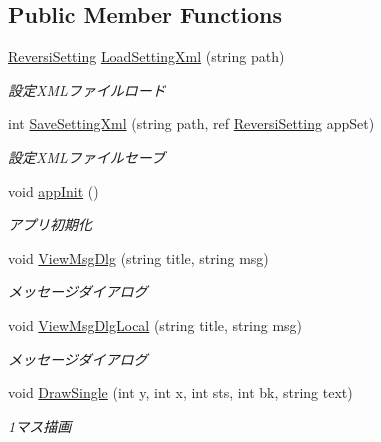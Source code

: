 \subsection*{Public Member Functions}
\begin{DoxyCompactItemize}
\item 
\hyperlink{class_reversi4color_form_1_1_reversi_setting}{Reversi\+Setting} \hyperlink{class_reversi4color_form_1_1_reversi_a944e9618d0eac2a6928d8a8ec835d384}{Load\+Setting\+Xml} (string path)
\begin{DoxyCompactList}\small\item\em 設定\+X\+M\+Lファイルロード \end{DoxyCompactList}\item 
int \hyperlink{class_reversi4color_form_1_1_reversi_aff9f10404fc96f56154073d324d4dea2}{Save\+Setting\+Xml} (string path, ref \hyperlink{class_reversi4color_form_1_1_reversi_setting}{Reversi\+Setting} app\+Set)
\begin{DoxyCompactList}\small\item\em 設定\+X\+M\+Lファイルセーブ \end{DoxyCompactList}\item 
void \hyperlink{class_reversi4color_form_1_1_reversi_ab30feb8c247bae6c78fa935456cf909a}{app\+Init} ()
\begin{DoxyCompactList}\small\item\em アプリ初期化 \end{DoxyCompactList}\item 
void \hyperlink{class_reversi4color_form_1_1_reversi_a4a67f1f9a3782d08790aa60b5ce10ab0}{View\+Msg\+Dlg} (string title, string msg)
\begin{DoxyCompactList}\small\item\em メッセージダイアログ \end{DoxyCompactList}\item 
void \hyperlink{class_reversi4color_form_1_1_reversi_a344c1f42605e074a5a110878a7cfe87a}{View\+Msg\+Dlg\+Local} (string title, string msg)
\begin{DoxyCompactList}\small\item\em メッセージダイアログ \end{DoxyCompactList}\item 
void \hyperlink{class_reversi4color_form_1_1_reversi_a5f463083da645873e96e605d25273357}{Draw\+Single} (int y, int x, int sts, int bk, string text)
\begin{DoxyCompactList}\small\item\em 1マス描画 \end{DoxyCompactList}\item 

\end{DoxyCompactItemize}
